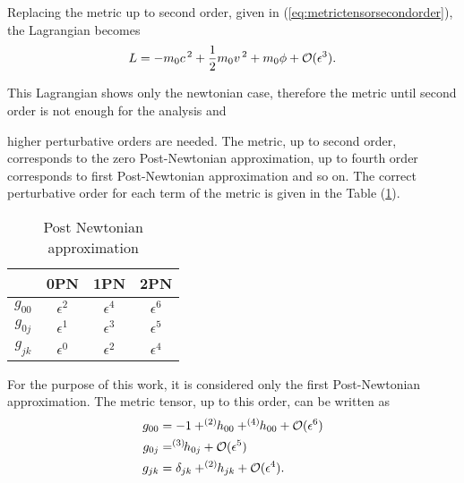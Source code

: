 Replacing the metric up to second order, given in (\ref{eq:metrictensorsecondorder}), the Lagrangian becomes
\begin{equation}
 L = -m_0c^{\hspace{0.05cm}2} +\frac{1}{2}m_0v^{\hspace{0.05cm}2}+m_0\phi + \mathcal{O}(\epsilon^{3}).
\end{equation}

This Lagrangian shows only the newtonian case, therefore the metric until second order is not enough for the analysis and

higher perturbative orders are needed. The metric, up to second order, corresponds to the zero Post-Newtonian approximation, up to fourth order corresponds to first Post-Newtonian approximation and so on. The correct perturbative order for each term of the metric is given in the Table (\ref{tab:tablePNorders}).\\
\begin{table}[htbp]
\centering
\begin{tabular}{c|ccc}
\centering
 & 0PN  & 1PN  &2PN  \\ \hline
 $g_{00}$&  $\epsilon^2$& $\epsilon^4$ & $\epsilon^6$ \\
 $g_{0j}$& $\epsilon^1$&$\epsilon^3$  &$\epsilon^5$    \\
 $g_{jk}$&$\epsilon^0 $ &  $\epsilon^2$&  $\epsilon^4$
\end{tabular}
  \caption{Post Newtonian approximation}
 \label{tab:tablePNorders}
\end{table}


For the purpose of this work, it is considered only the first Post-Newtonian approximation. The metric tensor, up to this order, can be written as
\begin{subequations}
\begin{align}
\label{eq:g00approx}
 g_{00} &= -1+ ^{(2)}\hspace{-0.1cm}h_{00}+ ^{(4)}\hspace{-0.1cm}h_{00}+\mathcal{O}(\epsilon^6)\\
 \label{eq:g0japprox}
 g_{0j} &= \hspace{-0.1cm}^{(3)}\hspace{-0.05cm}h_{0j}+ \mathcal{O}(\epsilon^5) \\
 \label{eq:gijapprox}
  g_{jk} &= \delta_{jk}+^{(2)}\hspace{-0.1cm}h_{jk}+\mathcal{O}(\epsilon^4).
\end{align}
\end{subequations}

